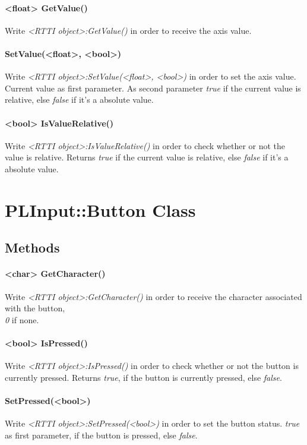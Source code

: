 \paragraph{<float> GetValue()}
Write \emph{<RTTI object>:GetValue()} in order to receive the axis value.

\paragraph{SetValue(<float>, <bool>)}
Write \emph{<RTTI object>:SetValue(<float>, <bool>)} in order to set the axis value. Current value as first parameter. As second parameter \emph{true} if the current value is relative, else \emph{false} if it's a absolute value.

\paragraph{<bool> IsValueRelative()}
Write \emph{<RTTI object>:IsValueRelative()} in order to check whether or not the value is relative. Returns \emph{true} if the current value is relative, else \emph{false} if it's a absolute value.




\section{PLInput::Button Class}


\subsection{Methods}

\paragraph{<char> GetCharacter()}
Write \emph{<RTTI object>:GetCharacter()} in order to receive the character associated with the button, \emph{\\0} if none.

\paragraph{<bool> IsPressed()}
Write \emph{<RTTI object>:IsPressed()} in order to check whether or not the button is currently pressed. Returns \emph{true}, if the button is currently pressed, else \emph{false}.

\paragraph{SetPressed(<bool>)}
Write \emph{<RTTI object>:SetPressed(<bool>)} in order to set the button status. \emph{true} as first parameter, if the button is pressed, else \emph{false}.

